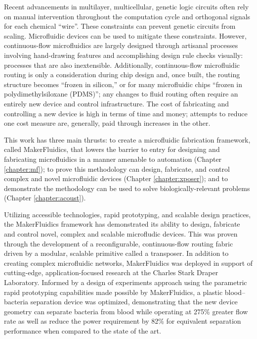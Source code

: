Recent advancements in multilayer, multicellular, genetic logic circuits often rely on manual intervention throughout the computation cycle and orthogonal signals for each chemical ``wire''. These constraints can prevent genetic circuits from scaling. Microfluidic devices can be used to mitigate these constraints. However, continuous-flow microfluidics are largely designed through artisanal processes involving hand-drawing features and accomplishing design rule checks visually: processes that are also inextensible. Additionally, continuous-flow microfluidic routing is only a consideration during chip design and, once built, the routing structure becomes ``frozen in silicon,'' or for many microfluidic chips ``frozen in polydimethylsiloxane (PDMS)''; any changes to fluid routing often require an entirely new device and control infrastructure. The cost of fabricating and controlling a new device is high in terms of time and money; attempts to reduce one cost measure are, generally, paid through increases in the other. 

This work has three main thrusts: to create a microfluidic fabrication framework, called MakerFluidics, that lowers the barrier to entry for designing and fabricating microfluidics in a manner amenable to automation (Chapter \ref{chapter:mf}); to prove this methodology can design, fabricate, and control complex and novel microfluidic devices (Chapter \ref{chapter:xposer}); and to demonstrate the methodology can be used to solve biologically-relevant problems (Chapter \ref{chapter:acoust}).

Utilizing accessible technologies, rapid prototyping, and scalable design practices, the MakerFluidics framework has demonstrated its ability to design, fabricate and control novel, complex and scalable microfludic devices. This was proven through the development of a reconfigurable, continuous-flow routing fabric driven by a modular, scalable primitive called a transposer. In addition to creating complex microfluidic networks, MakerFluidics was deployed in support of cutting-edge, application-focused research at the Charles Stark Draper Laboratory. Informed by a design of experiments approach using the parametric rapid prototyping capabilities made possible by MakerFluidics, a plastic blood--bacteria separation device was optimized, demonstrating that the new device geometry can separate bacteria from blood while operating at 275\% greater flow rate as well as reduce the power requirement by 82\% for equivalent separation performance when compared to the state of the art. 

